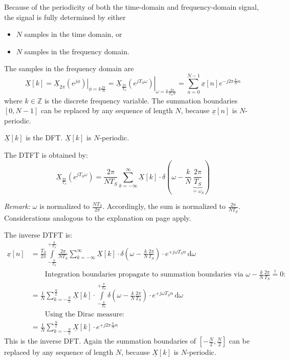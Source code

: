 \begin{refsection}
Because of the periodicity of both the time-domain and frequency-domain signal, the signal is fully determined by either
\begin{itemize}
	\item $N$ samples in the time domain, or
	\item $N$ samples in the frequency domain.
\end{itemize}

The samples in the frequency domain are
\begin{equation}
	\underline{X}[k] = \left.\underline{X}_{2 \pi} \left(e^{j \phi}\right)\right|_{\phi = k \frac{2\pi}{N}} = \left.\underline{X}_{\frac{2\pi}{T_S}} \left(e^{j T_S \omega}\right)\right|_{\omega = k \frac{2\pi}{T_S N}} = \sum\limits_{n = 0}^{N-1} \underline{x}[n] e^{-j 2\pi \frac{k}{N} n}
\end{equation}
where $k \in \mathbb{Z}$ is the discrete frequency variable. The summation boundaries $[0, N-1]$ can be replaced by any sequence of length $N$, because $\underline{x}[n]$ is $N$-periodic.

$\underline{X}[k]$ is the \ac{DFT}. $\underline{X}[k]$ is $N$-periodic.

The \ac{DTFT} is obtained by:
\begin{equation}
	\underline{X}_{\frac{2\pi}{T_S}} \left(e^{j T_S \omega}\right) = \frac{2\pi}{N T_S} \sum\limits_{k = -\infty}^{\infty} \underline{X}[k] \cdot \delta\left(\omega - \frac{k}{N} \underbrace{\frac{2\pi}{T_S}}_{= \omega_S}\right)
\end{equation}

\textit{Remark:} $\omega$ is normalized to $\frac{N T_S}{2\pi}$. Accordingly, the sum is normalized to $\frac{2\pi}{N T_S}$. Considerations analogous to the explanation on page \pageref{ref:ch04:normalization_xs} apply.

The inverse \ac{DTFT} is:
\begin{equation}
	\begin{split}
		\underline{x}[n] &= \frac{T_S}{2 \pi} \int\limits_{- \frac{\pi}{T_S}}^{+ \frac{\pi}{T_S}} \frac{2\pi}{N T_S} \sum\limits_{k = -\infty}^{\infty} \underline{X}[k] \cdot \delta\left(\omega - \frac{k}{N} \frac{2\pi}{T_S}\right) \cdot e^{+ j \omega T_S n} \, \mathrm{d} \omega \\
		 &\qquad \text{Integration boundaries propagate to summation boundaries via $\omega - \frac{k}{N} \frac{2\pi}{T_S} \stackrel{!}{=} 0$:} \\
		 &= \frac{1}{N} \sum\limits_{k = -\frac{N}{2}}^{\frac{N}{2}} \underline{X}[k] \cdot \int\limits_{- \frac{\pi}{T_S}}^{+ \frac{\pi}{T_S}} \delta\left(\omega - \frac{k}{N} \frac{2\pi}{T_S}\right) \cdot e^{+ j \omega T_S n} \, \mathrm{d} \omega \\
		 &\qquad \text{Using the Dirac measure:} \\
		 &= \frac{1}{N} \sum\limits_{k = -\frac{N}{2}}^{\frac{N}{2}} \underline{X}[k] \cdot e^{+ j 2\pi \frac{k}{N} n}
	\end{split}
\end{equation}
This is the inverse \ac{DFT}. Again the summation boundaries of $[-\frac{N}{2}, \frac{N}{2}]$ can be replaced by any sequence of length $N$, because $\underline{X}[k]$ is $N$-periodic.


\end{refsection}
